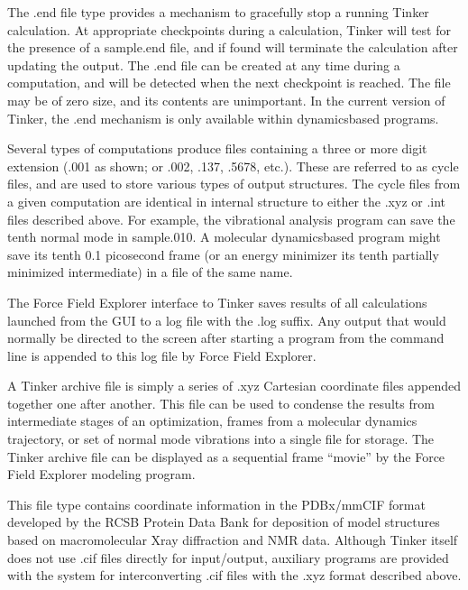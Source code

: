 \documentclass[letterpaper,11pt,english]{sphinxmanual}
\begin{document}
\sphinxAtStartPar
The .end file type provides a mechanism to gracefully stop a running Tinker calculation. At appropriate checkpoints during a calculation, Tinker will test for the presence of a sample.end file, and if found will terminate the calculation after updating the output. The .end file can be created at any time during a computation, and will be detected when the next checkpoint is reached. The file may be of zero size, and its contents are unimportant. In the current version of Tinker, the .end mechanism is only available within dynamics\sphinxhyphen{}based programs.

\sphinxAtStartPar
{}

\sphinxAtStartPar
Several types of computations produce files containing a three or more digit extension (.001 as shown; or .002, .137, .5678, etc.). These are referred to as cycle files, and are used to store various types of output structures. The cycle files from a given computation are identical in internal structure to either the .xyz or .int files described above. For example, the vibrational analysis program can save the tenth normal mode in sample.010. A molecular dynamics\sphinxhyphen{}based program might save its tenth 0.1 picosecond frame (or an energy minimizer its tenth partially minimized intermediate) in a file of the same name.

\sphinxAtStartPar
{}

\sphinxAtStartPar
The Force Field Explorer interface to Tinker saves results of all calculations launched from the GUI to a log file with the .log suffix. Any output that would normally be directed to the screen after starting a program from the command line is appended to this log file by Force Field Explorer.

\sphinxAtStartPar
{}

\sphinxAtStartPar
A Tinker archive file is simply a series of .xyz Cartesian coordinate files appended together one after another. This file can be used to condense the results from intermediate stages of an optimization, frames from a molecular dynamics trajectory, or set of normal mode vibrations into a single file for storage. The Tinker archive file can be displayed as a sequential frame “movie” by the Force Field Explorer modeling program.

\sphinxAtStartPar
{}

\sphinxAtStartPar
This file type contains coordinate information in the PDBx/mmCIF format developed by the RCSB Protein Data Bank for deposition of model structures based on macromolecular X\sphinxhyphen{}ray diffraction and NMR data. Although Tinker itself does not use .cif files directly for input/output, auxiliary programs are provided with the system for interconverting .cif files with the .xyz format described above.
\end{document}
